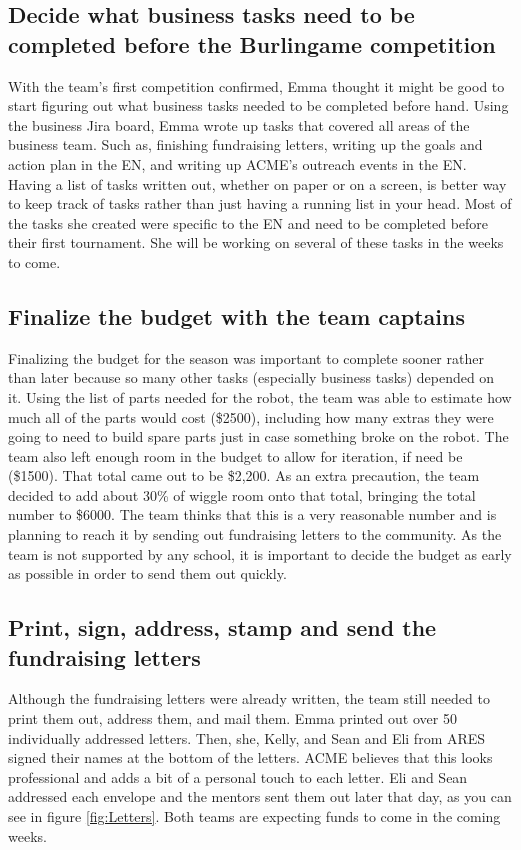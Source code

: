 \documentclass{article}
\newif\ifcontents
\begin{document}
\contentsfalse
\subsection{Decide what business tasks need to be completed before the Burlingame competition}
With the team's first competition confirmed, Emma thought it might be good to start figuring out what business tasks needed to be completed before hand. Using the business Jira board, Emma wrote up tasks that covered all areas of the business team. Such as, finishing fundraising letters, writing up the goals and action plan in the EN, and writing up ACME's outreach events in the EN. Having a list of tasks written out, whether on paper or on a screen, is better way to keep track of tasks rather than just having a running list in your head. Most of the tasks she created were specific to the EN and need to be completed before their first tournament. She will be working on several of these tasks in the weeks to come.

\subsection{Finalize the budget with the team captains}
Finalizing the budget for the season was important to complete sooner rather than later because so many other tasks (especially business tasks) depended on it. Using the list of parts needed for the robot, the team was able to estimate how much all of the parts would cost (\$2500), including how many extras they were going to need to build spare parts just in case something broke on the robot. The team also left enough room in the budget to allow for iteration, if need be (\$1500). That total came out to be \$2,200. As an extra precaution, the team decided to add about 30\% of wiggle room onto that total, bringing the total number to \$6000. The team thinks that this is a very reasonable number and is planning to reach it by sending out fundraising letters to the community. As the team is not supported by any school, it is important to decide the budget as early as possible in order to send them out quickly.

\subsection{Print, sign, address, stamp and send the fundraising letters}
Although the fundraising letters were already written, the team still needed to print them out, address them, and mail them. Emma printed out over 50 individually addressed letters. Then, she, Kelly, and Sean and Eli from ARES signed their names at the bottom of the letters. ACME believes that this looks professional and adds a bit of a personal touch to each letter.  Eli and Sean addressed each envelope and the mentors sent them out later that day, as you can see in figure \ref{fig:Letters}. Both teams are expecting funds to come in the coming weeks. 
\end{document}
